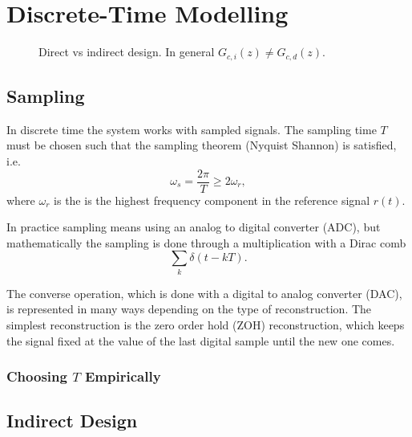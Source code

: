
\section{Discrete-Time Modelling}

\begin{figure}
	\centering
	
	\caption{
		Direct vs indirect design. In general \(G_{c,i}(z) \neq G_{c,d}(z)\).
		\label{fig:direct-vs-indirect}
	}
\end{figure}

\subsection{Sampling}

In discrete time the system works with sampled signals. The sampling time \(T\) must be chosen such that the sampling theorem (Nyquist Shannon) is satisfied, i.e.
\[
	\omega_s = \frac{2\pi}{T} \geq 2 \omega_r,
\]
where \(\omega_r\) is the is the highest frequency component in the reference signal \(r(t)\).

In practice sampling means using an analog to digital converter (ADC), but mathematically the sampling is done through a multiplication with a Dirac comb
\[
	\sum_k \delta(t - kT).
\]

The converse operation, which is done with a digital to analog converter (DAC), is represented in many ways depending on the type of reconstruction. The simplest reconstruction is the zero order hold (ZOH) reconstruction, which keeps the signal fixed at the value of the last digital sample until the new one comes.

\subsubsection{Choosing \(T\) Empirically}



\subsection{Indirect Design}

